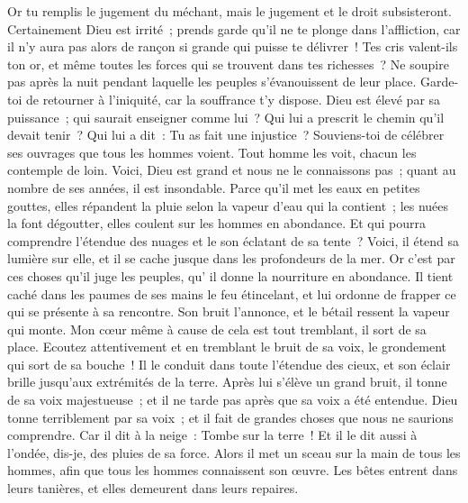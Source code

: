 \begin{multicols}{2}
Or tu remplis le jugement du méchant, mais le jugement et le droit subsisteront.
Certainement Dieu est irrité~; prends garde qu'il ne te plonge dans l'affliction, car il n'y aura pas alors de rançon si grande qui puisse te délivrer~!
Tes cris valent-ils ton or, et même toutes les forces qui se trouvent dans tes richesses~?
Ne soupire pas après la nuit pendant laquelle les peuples s'évanouissent de leur place.
Garde-toi de retourner à l'iniquité, car la souffrance t'y dispose.
Dieu est élevé par sa puissance~; qui saurait enseigner comme lui~?
Qui lui a prescrit le chemin qu'il devait tenir~? Qui lui a dit~: Tu as fait une injustice~?
Souviens-toi de célébrer ses ouvrages que tous les hommes voient.
Tout homme les voit, chacun les contemple de loin.
Voici, Dieu est grand et nous ne le connaissons pas~; quant au nombre de ses années, il est insondable.
Parce qu'il met les eaux en petites gouttes, elles répandent la pluie selon la vapeur d'eau qui la contient~;
les nuées la font dégoutter, elles coulent sur les hommes en abondance.
Et qui pourra comprendre l'étendue des nuages et le son éclatant de sa tente~?
Voici, il étend sa lumière sur elle, et il se cache jusque dans les profondeurs de la mer.
 Or c'est par ces choses qu'il juge les peuples, qu' il donne la nourriture en abondance.
 Il tient caché dans les paumes de ses mains le feu étincelant, et lui ordonne de frapper ce qui se présente à sa rencontre.
 Son bruit l'annonce, et le bétail ressent la vapeur qui monte.
\VerseOne{}Mon cœur même à cause de cela est tout tremblant, il sort de sa place.
Ecoutez attentivement et en tremblant le bruit de sa voix, le grondement qui sort de sa bouche~!
Il le conduit dans toute l'étendue des cieux, et son éclair brille jusqu'aux extrémités de la terre.
Après lui s'élève un grand bruit, il tonne de sa voix majestueuse~; et il ne tarde pas après que sa voix a été entendue.
Dieu tonne terriblement par sa voix~; et il fait de grandes choses que nous ne saurions comprendre.
Car il dit à la neige~: Tombe sur la terre~! Et il le dit aussi à l'ondée, dis-je, des pluies de sa force.
Alors il met un sceau sur la main de tous les hommes, afin que tous les hommes connaissent son œuvre.
Les bêtes entrent dans leurs tanières, et elles demeurent dans leurs repaires.

\end{multicols}
